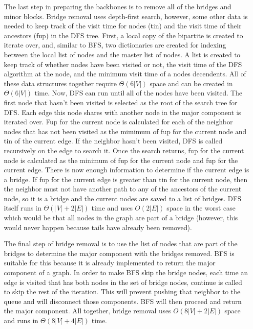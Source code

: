 \documentclass{article}
\begin{document}
        \par
        The last step in preparing the backbones is to remove all of the bridges and minor blocks. Bridge removal uses depth-first search, however, some other data is needed to keep track of the visit time for nodes (tin) and the visit time of their ancestors (fup) in the DFS tree. First, a local copy of the bipartite is created to iterate over, and, similar to BFS, two dictionaries are created for indexing between the local list of nodes and the master list of nodes. A list is created to keep track of whether nodes have been visited or not, the visit time of the DFS algorithm at the node, and the minimum visit time of a nodes decendents. All of these data structures together require $\Theta(6|V|)$ space and can be created in $\Theta(6|V|)$ time. Now, DFS can run until all of the nodes have been visited. The first node that hasn't been visited is selected as the root of the search tree for DFS. Each edge this node shares with another node in the major component is iterated over. Fup for the current node is calculated for each of the neighbor nodes that has not been visited as the mimimum of fup for the current node and tin of the current edge. If the neighbor hasn't been visited, DFS is called recursively on the edge to search it. Once the search returns, fup for the current node is calculated as the minimum of fup for the current node and fup for the current edge. There is now enough information to determine if the current edge is a bridge. If fup for the current edge is greater than tin for the current node, then the neighbor must not have another path to any of the ancestors of the current node, so it is a bridge and the current nodes are saved to a list of bridges. DFS itself runs in $\Theta(|V| + 2|E|)$ time and uses $O(2|E|)$ space in the worst case which would be that all nodes in the graph are part of a bridge (however, this would never happen because tails have already been removed).
        \par
        The final step of bridge removal is to use the list of nodes that are part of the bridges to determine the major component with the bridges removed. BFS is suitable for this because it is already implemented to return the major component of a graph. In order to make BFS skip the bridge nodes, each time an edge is visited that has both nodes in the set of bridge nodes, continue is called to skip the rest of the iteration. This will prevent pushing that neighbor to the queue and will disconnect those components. BFS will then proceed and return the major component. All together, bridge removal uses $O(8|V| + 2|E|)$ space and runs in $\Theta(8|V| + 4|E|)$ time.
\end{document}
